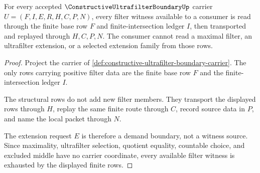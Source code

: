 \begin{theorem}
\label{thm:constructive-ultrafilter-boundary-finite-filter-row}
For every accepted $\ConstructiveUltrafilterBoundaryUp$ carrier $U=(F,I,E,R,H,C,P,N)$, every filter witness available to a consumer is read through the finite base row $F$ and finite-intersection ledger $I$, then transported and replayed through $H,C,P,N$. The consumer cannot read a maximal filter, an ultrafilter extension, or a selected extension family from those rows.
\end{theorem}
\begin{proof}
Project the carrier of \autoref{def:constructive-ultrafilter-boundary-carrier}. The only rows carrying positive filter data are the finite base row $F$ and the finite-intersection ledger $I$.

The structural rows do not add new filter members. They transport the displayed rows through $H$, replay the same finite route through $C$, record source data in $P$, and name the local packet through $N$.

The extension request $E$ is therefore a demand boundary, not a witness source. Since maximality, ultrafilter selection, quotient equality, countable choice, and excluded middle have no carrier coordinate, every available filter witness is exhausted by the displayed finite rows.
\end{proof}

